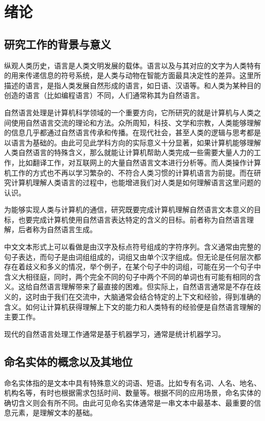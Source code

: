 
\chapter{绪论}
\section{研究工作的背景与意义}
纵观人类历史，语言是人类文明发展的载体。语言以及与其对应的文字为人类特有的用来传递信息的符号系统，是人类与动物在智能方面最具决定性的差异。这里所描述的语言，是指人类发展自然形成的语言，如日语、汉语等。和人类为某种目的创造的语言（比如编程语言）不同，人们通常称其为自然语言。

自然语言处理是计算机科学领域的一个重要方向，它所研究的就是计算机与人类之间使用自然语言交流的理论和方法。众所周知，科技、文学和宗教，人类能够理解的信息几乎都通过自然语言传承和传播。在现代社会，甚至人类的逻辑与思考都是以语言为基础的。由此可见此学科方向的实际意义十分显著，如果计算机能够理解人类自然语言的特殊含义，那么就能让计算机帮助人类完成一些需要大量人力的工作，比如翻译工作，对互联网上的大量自然语言文本进行分析等。而人类操作计算机工作的方式也不再以学习繁杂的、不符合人类习惯的计算机语言为前提。而在研究计算机理解人类语言的过程中，也能增进我们对人类是如何理解语言这里问题的认识。

为能够实现人类与计算机的通信，研究既要完成计算机理解自然语言文本意义的目标，也要完成计算机使用自然语言表达特定的含义的目标。前者称为自然语言理解，后者称为自然语言生成。

中文文本形式上可以看做是由汉字及标点符号组成的字符序列。含义通常由完整的句子表达，而句子是由词组组成的，词组又由单个汉字组成。但无论是任何层次都存在着歧义和多义的情况，举个例子，在某个句子中的词组，可能在另一个句子中含义大相径庭，同时，两个完全不同的句子中两个不同的单词也有可能有相同的含义。这给自然语言理解带来了最直接的困难。但实际上，自然语言通常是不存在歧义的，这时由于我们在交流中，大脑通常会结合特定的上下文和经验，得到准确的含义。如何让计算机获得理解上下文的能力和人类特有的经验便是自然语言理解的主要工作。

现代的自然语言处理工作通常是基于机器学习，通常是统计机器学习。
\section{命名实体的概念以及其地位}
命名实体指的是文本中具有特殊意义的词语、短语。比如专有名词、人名、地名、机构名等，有时也根据需求包括时间、数量等。根据不同的应用场景，命名实体的确切含义则会有所不同。由此可见命名实体通常是一串文本中最基本、最重要的信息元素，是理解文本的基础。

